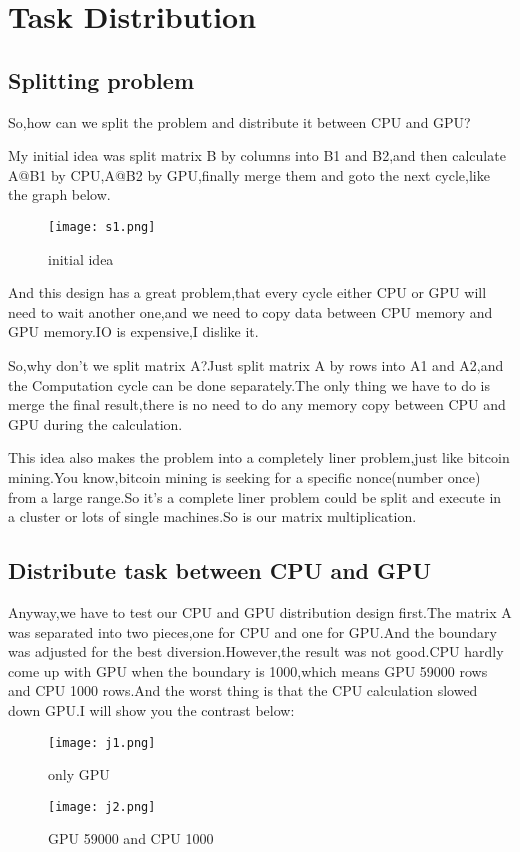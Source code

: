 \documentclass[12pt]{scrartcl} %
\begin{document}
\section{Task Distribution}
\subsection{Splitting problem}
So,how can we split the problem and distribute it between CPU and GPU?

My initial idea was split matrix B by columns into B1 and B2,and then calculate A@B1 by CPU,A@B2 by GPU,finally merge them and goto the next cycle,like the graph below.
\begin{figure}[H]
    \centering
    \texttt{[image: s1.png]}
    \label{}
    \caption{initial idea}
\end{figure}

And this design has a great problem,that every cycle either CPU or GPU will need to wait another one,and we need to copy data between CPU memory and GPU memory.IO is expensive,I dislike it.

So,why don't we split matrix A?Just split matrix A by rows into A1 and A2,and the Computation cycle can be done separately.The only thing we have to do is merge the final result,there is no need to do any memory copy between CPU and GPU during the calculation.

This idea also makes the problem into a completely liner problem,just like bitcoin mining.You know,bitcoin mining is seeking for a specific nonce(number once) from a large range.So it's a complete liner problem could be split and execute in a cluster or lots of single machines.So is our matrix multiplication.
\subsection{Distribute task between CPU and GPU}
Anyway,we have to test our CPU and GPU distribution design first.The matrix A was separated into two pieces,one for CPU and one for GPU.And the boundary was adjusted for the best diversion.However,the result was not good.CPU hardly come up with GPU when the boundary is 1000,which means GPU 59000 rows and CPU 1000 rows.And the worst thing is that the CPU calculation slowed down GPU.I will show you the contrast below:
\begin{figure}[H]
    \centering
    \texttt{[image: j1.png]}
    \caption{only GPU}
    \label{}
\end{figure}
\begin{figure}[H]
    \centering
    \texttt{[image: j2.png]}
    \caption{GPU 59000 and CPU 1000}
    \label{}
\end{figure}
\end{document}
